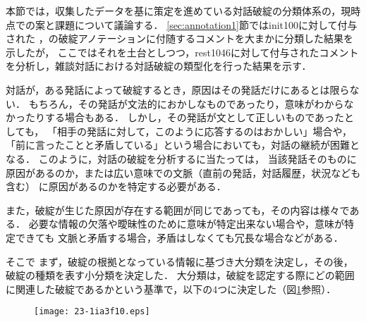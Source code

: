 \documentclass[japanese]{jnlp_1.4}
\newcommand{\batsu}{}
\newcommand{\sankaku}{}
\begin{document}
本節では，収集したデータを基に策定を進めている対話破綻の分類体系の，現時点での案と課題について議論する．
\ref{sec:annotation1}節ではinit100に対して付与された \sankaku，\batsu の破綻アノテーションに付随するコメントを大まかに分類した結果を示したが，
ここではそれを土台としつつ，rest1046に対して付与されたコメントを分析し，雑談対話における対話破綻の類型化を行った結果を示す．

対話が，ある発話によって破綻するとき，原因はその発話だけにあるとは限らない．
もちろん，その発話が文法的におかしなものであったり，意味がわからなかったりする場合もある．
しかし，その発話が文として正しいものであったとしても，
「相手の発話に対して，このように応答するのはおかしい」場合や，「前に言ったことと矛盾している」という場合においても，対話の継続が困難となる．
このように，対話の破綻を分析するに当たっては，
当該発話そのものに原因があるのか，または広い意味での文脈（直前の発話，対話履歴，状況なども含む）
に原因があるのかを特定する必要がある．

また，破綻が生じた原因が存在する範囲が同じであっても，その内容は様々である．
必要な情報の欠落や曖昧性のために意味が特定出来ない場合や，意味が特定できても
文脈と矛盾する場合，矛盾はしなくても冗長な場合などがある．

そこで
まず，破綻の根拠となっている情報に基づき大分類を決定し，その後，破綻の種類を表す小分類を決定した．
大分類は，破綻を認定する際にどの範囲に関連した破綻であるかという基準で，以下の4つに決定した（図\ref{wg2}参照）．

\clearpage

\begin{figure}[t]
\begin{center}
\texttt{[image: 23-1ia3f10.eps]}
\end{center}
\label{wg2}
\end{figure}
\end{document}
